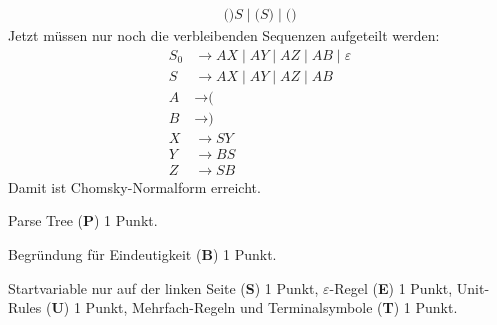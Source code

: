 \begin{loesung}
\begin{teilaufgaben}
\begin{align*}
\texttt{(}  \texttt{)} S \;|\;
\texttt{(} S \texttt{)}  \;|\;
\texttt{(}  \texttt{)} 
\end{align*}
Jetzt müssen nur noch die verbleibenden Sequenzen aufgeteilt werden:
\begin{align*}
S_0&\rightarrow
AX \;|\;
AY \;|\;
AZ  \;|\;
AB 
\;|\;
\varepsilon
\\
S&\rightarrow
AX \;|\;
AY \;|\;
AZ  \;|\;
AB 
\\
A&\rightarrow \texttt{(}\\
B&\rightarrow \texttt{)}\\
X&\rightarrow SY \\
Y&\rightarrow BS \\
Z&\rightarrow SB
\end{align*}
Damit ist Chomsky-Normalform erreicht.
\qedhere
\end{teilaufgaben}
\end{loesung}

\begin{bewertung}
\begin{teilaufgaben}
\item
Parse Tree ({\bf P}) 1 Punkt.
\item
Begründung für Eindeutigkeit ({\bf B})  1 Punkt.
\item
Startvariable nur auf der linken Seite ({\bf S}) 1 Punkt,
$\varepsilon$-Regel ({\bf E}) 1 Punkt,
Unit-Rules ({\bf U}) 1 Punkt,
Mehrfach-Regeln und Terminalsymbole ({\bf T}) 1 Punkt.
\end{teilaufgaben}
\end{bewertung}




